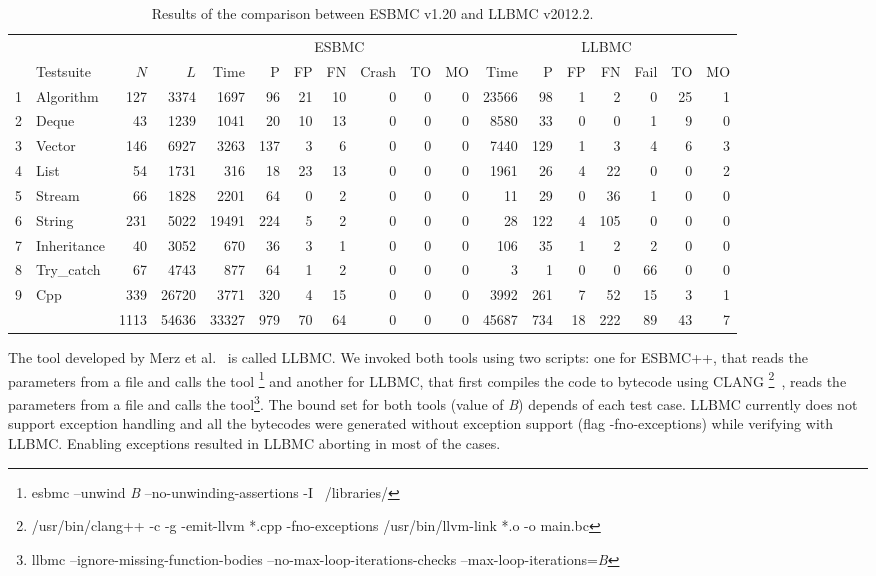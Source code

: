\documentclass[a4paper]{llncs}
\begin{document}
\begin{table}[t!]
\renewcommand\arraystretch{0.9}
\setlength{\tabcolsep}{4pt}
\begin{center} {\small
\begin{tabular}{|c|l|r|r||r|r|r|r|r|r|r|r|r|r|r|r|r|r|}
\hline
  & & & & \multicolumn{7}{c|}{ESBMC} & \multicolumn{7}{c|}{LLBMC} \\  \cline{5-18}
  & Testsuite & $N$ & $L$ & Time & P   & FP  & FN  & Crash & TO  & MO & Time & P   & FP  & FN  & Fail & TO  & MO \\\hline
1 & Algorithm & 127 & 3374 & 1697 & 96 & 21 & 10 & 0 & 0 & 0 & 23566 & 98 & 1 & 2 & 0 & 25 & 1\\ %
\hline
2 & Deque & 43 & 1239 & 1041 & 20 & 10 & 13 & 0 & 0 & 0 & 8580 & 33 & 0 & 0 & 1 & 9 & 0\\ %
\hline
3 & Vector & 146 & 6927 & 3263 & 137 & 3 & 6 & 0 & 0 & 0 & 7440 & 129 & 1 & 3 & 4 & 6 & 3\\ %
\hline
4 & List & 54 & 1731 & 316 & 18 & 23 & 13 & 0 & 0 & 0 & 1961 & 26 & 4 & 22 & 0 & 0 & 2\\ %
\hline
5 & Stream & 66 & 1828 & 2201 & 64 & 0 & 2 & 0 & 0 & 0 & 11 & 29 & 0 & 36 & 1 & 0 & 0\\ %
\hline
6 & String & 231 & 5022 & 19491 & 224& 5 & 2 & 0 & 0 & 0 & 28 & 122 & 4 & 105 & 0 & 0 & 0\\ %
\hline
7 & Inheritance & 40 & 3052 & 670 & 36 & 3 & 1 & 0 & 0 & 0 & 106 & 35 & 1 & 2 & 2 & 0 & 0\\ %
\hline
8 & Try\_catch & 67 & 4743 & 877 & 64 & 1 & 2 & 0 & 0 & 0 & 3 & 1 & 0 & 0 & 66 & 0 & 0 \\ %
\hline
9 & Cpp & 339 & 26720 & 3771 & 320 & 4 & 15 & 0 & 0 & 0 & 3992 & 261 & 7 & 52 & 15 & 3 & 1\\ %
\hline\hline
  &     &  1113 & 54636 & 33327 & 979 & 70 & 64 & 0 & 0 & 0 & 45687 & 734 & 18 & 222 & 89 & 43 & 7\\
\hline
\end{tabular} }
\end{center}
\caption{Results of the comparison between ESBMC v1.20 and LLBMC v2012.2.}
\label{table:results-of-the-comparison-between-ESBMC-and-LLBMC}
\end{table}

The tool developed by Merz et al.~\cite{Florian12} is called LLBMC.
We invoked both tools using two scripts: one for ESBMC++, that reads
the parameters from a file and calls the tool
\footnote[1]{esbmc --unwind \textit{B} --no-unwinding-assertions -I ~/libraries/}
and another for LLBMC, that first compiles the code to bytecode using CLANG
\footnote[2]{/usr/bin/clang++ -c -g -emit-llvm *.cpp -fno-exceptions \newline /usr/bin/llvm-link *.o -o main.bc}~\cite{CLANG},
reads the parameters from a file and calls the tool\footnote[3]
{llbmc --ignore-missing-function-bodies --no-max-loop-iterations-checks --max-loop-iterations=\textit{B}}.
The bound set for both tools (value of \textit{B}) depends of each test case.
LLBMC currently does not support exception handling and all the bytecodes were generated without
exception support (flag -fno-exceptions) while verifying with LLBMC.
Enabling exceptions resulted in LLBMC aborting in most of the cases.
\end{document}
